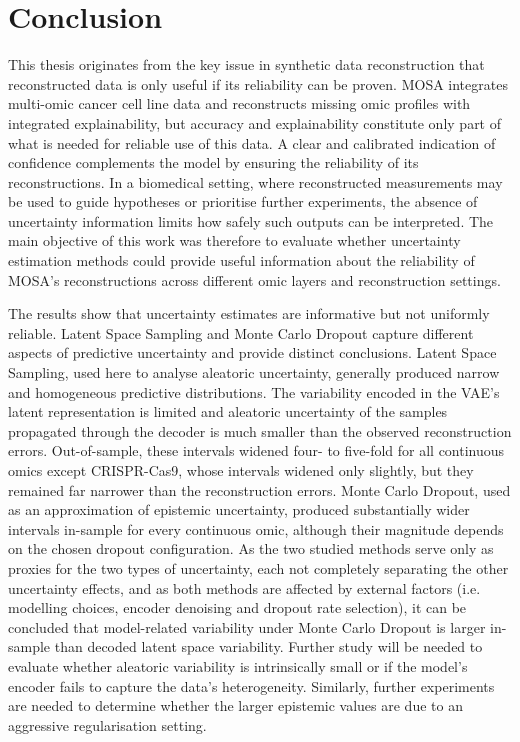
\chapter{Conclusion}
\label{chapter:conclusion}

This thesis originates from the key issue in synthetic data reconstruction that reconstructed data is only useful if its reliability can be proven. MOSA integrates multi-omic cancer cell line data and reconstructs missing omic profiles with integrated explainability, but accuracy and explainability constitute only part of what is needed for reliable use of this data. A clear and calibrated indication of confidence complements the model by ensuring the reliability of its reconstructions. In a biomedical setting, where reconstructed measurements may be used to guide hypotheses or prioritise further experiments, the absence of uncertainty information limits how safely such outputs can be interpreted. The main objective of this work was therefore to evaluate whether uncertainty estimation methods could provide useful information about the reliability of MOSA's reconstructions across different omic layers and reconstruction settings.

The results show that uncertainty estimates are informative but not uniformly reliable. Latent Space Sampling and Monte Carlo Dropout capture different aspects of predictive uncertainty and provide distinct conclusions. Latent Space Sampling, used here to analyse aleatoric uncertainty, generally produced narrow and homogeneous predictive distributions. The variability encoded in the VAE's latent representation is limited and aleatoric uncertainty of the samples propagated through the decoder is much smaller than the observed reconstruction errors. Out-of-sample, these intervals widened four- to five-fold for all continuous omics except CRISPR-Cas9, whose intervals widened only slightly, but they remained far narrower than the reconstruction errors. Monte Carlo Dropout, used as an approximation of epistemic uncertainty, produced substantially wider intervals in-sample for every continuous omic, although their magnitude depends on the chosen dropout configuration. As the two studied methods serve only as proxies for the two types of uncertainty, each not completely separating the other uncertainty effects, and as both methods are affected by external factors (i.e. modelling choices, encoder denoising and dropout rate selection), it can be concluded that model-related variability under Monte Carlo Dropout is larger in-sample than decoded latent space variability. Further study will be needed to evaluate whether aleatoric variability is intrinsically small or if the model's encoder fails to capture the data's heterogeneity. Similarly, further experiments are needed to determine whether the larger epistemic values are due to an aggressive regularisation setting.


